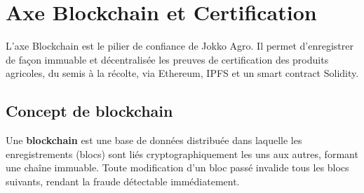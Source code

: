 \documentclass[12pt,a4paper]{report}
\begin{document}
\chapter{Axe Blockchain et Certification}

\begin{tcolorbox}[chapterbox,title={Vue d'ensemble du chapitre}]
  L'axe Blockchain est le pilier de confiance de Jokko Agro. Il permet d'enregistrer de
  façon immuable et décentralisée les preuves de certification des produits agricoles, du
  semis à la récolte, via Ethereum, IPFS et un smart contract Solidity.
\end{tcolorbox}

\vspace{0.5cm}

\section{Concept de blockchain}

\noindent
Une \textbf{blockchain} est une base de données distribuée dans laquelle les enregistrements
(blocs) sont liés cryptographiquement les uns aux autres, formant une chaîne immuable. Toute
modification d'un bloc passé invalide tous les blocs suivants, rendant la fraude détectable
immédiatement.

\vspace{0.4cm}
\end{document}
